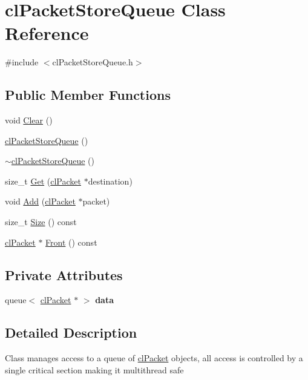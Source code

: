 \hypertarget{classcl_packet_store_queue}{
\section{clPacketStoreQueue Class Reference}
\label{classcl_packet_store_queue}
}


{\ttfamily \#include $<$clPacketStoreQueue.h$>$}\subsection*{Public Member Functions}
\begin{DoxyCompactItemize}
\item 
void \hyperlink{classcl_packet_store_queue_a06aa8e6dacc2183cb37f163f7f1a8a31}{Clear} ()
\item 
\hyperlink{classcl_packet_store_queue_a4616668741a61b8c334c27abdea4fb15}{clPacketStoreQueue} ()
\item 
\hyperlink{classcl_packet_store_queue_a5508ed725e4d75b8c4292d30eccd00b8}{$\sim$clPacketStoreQueue} ()
\item 
size\_\-t \hyperlink{classcl_packet_store_queue_ac5758eef3544e8c4b8d4b4344cce5f2d}{Get} (\hyperlink{classcl_packet}{clPacket} $\ast$destination)
\item 
void \hyperlink{classcl_packet_store_queue_afb416bfa29b0cc2f85beb068480d74ea}{Add} (\hyperlink{classcl_packet}{clPacket} $\ast$packet)
\item 
size\_\-t \hyperlink{classcl_packet_store_queue_a022743398c3c8ad4bf4f48c7ce5e0261}{Size} () const 
\item 
\hyperlink{classcl_packet}{clPacket} $\ast$ \hyperlink{classcl_packet_store_queue_aa108b947f9a6016c1034cb2b9a5ba27a}{Front} () const 
\end{DoxyCompactItemize}
\subsection*{Private Attributes}
\begin{DoxyCompactItemize}
\item 
\hypertarget{classcl_packet_store_queue_acc70b6a2b972203c992a4523050e7ab3}{
queue$<$ \hyperlink{classcl_packet}{clPacket} $\ast$ $>$ {\bfseries data}}
\label{classcl_packet_store_queue_acc70b6a2b972203c992a4523050e7ab3}

\end{DoxyCompactItemize}


\subsection{Detailed Description}
Class manages access to a queue of \hyperlink{classcl_packet}{clPacket} objects, all access is controlled by a single critical section making it multithread safe 

